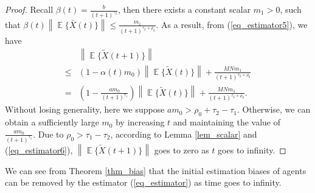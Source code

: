 \documentclass[10pt,journal,final]{IEEEtran}
\DeclareMathOperator{\Expect}{\mathbb{E}}
\newcommand{\norm}[1]{\left\lVert#1\right\rVert}
\theoremstyle{plain}
\theoremstyle{definition}
\theoremstyle{remark}
\begin{document}
\begin{proof}
Recall $\beta(t)=\frac{b}{(t+1)^{\tau_2}}$, then there exists a constant scalar $m_1>0$, such that $\beta(t)\norm{\Expect\{\bar X(t)\}}\leq  \frac{m_1}{(t+1)^{\tau_2+\rho_0}}$.
As a result, from (\ref{eq_estimator5}), we have
\begin{align}\label{eq_estimator6}
&\norm{\Expect\{\tilde X(t+1)\}}\nonumber\\
\leq& (1-\alpha(t)m_0)\norm{\Expect\{\tilde X(t)\}}+\frac{MNm_1}{(t+1)^{\tau_2+\rho_0}}\\
=& (1-\frac{am_0}{(t+1)^{\tau_1}})\norm{\Expect\{\tilde X(t)\}}+\frac{MNm_1}{(t+1)^{\tau_2+\rho_0}}\nonumber.
\end{align}
Without losing generality, here we suppose $am_0>\rho_0+\tau_2-\tau_1$. Otherwise, we can obtain a sufficiently large $m_0$ by increasing $t$ and maintaining the value of $\frac{am_0}{(t+1)^{\tau_1}}.$ Due to $\rho_0>\tau_1-\tau_2$,  according to Lemma \ref{lem_scalar} and (\ref{eq_estimator6}), $\norm{\Expect\{\tilde X(t+1)\}}$ goes to zero as $t$ goes to infinity. 
\end{proof}
We can see from Theorem \ref{thm_bias} that the initial estimation biases of agents can be removed by the estimator (\ref{eq_estimator}) as time goes to infinity.
\end{document}
